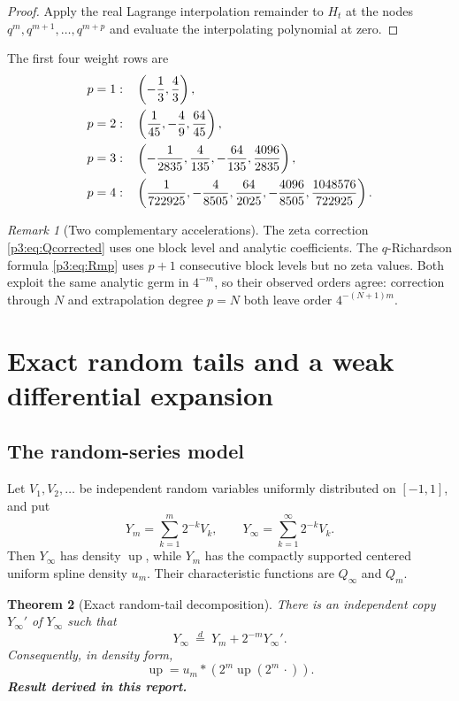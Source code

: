 \documentclass[11pt,oneside]{article}
\numberwithin{equation}{section}
\newtheorem{theorem}{Theorem}[section]
\theoremstyle{definition}
\theoremstyle{remark}
\newtheorem{remark}[theorem]{Remark}
\newcommand{\Up}{\operatorname{up}}
\newcommand{\newresult}{\textbf{Result derived in this report.}}
\begin{document}
\begin{proof}
Apply the real Lagrange interpolation remainder to $H_t$ at the nodes
$q^m,q^{m+1},\ldots,q^{m+p}$ and evaluate the interpolating polynomial at zero.
\end{proof}

The first four weight rows are
\begin{align}
 p=1:&\quad \left(-\frac13,\frac43\right),\notag\\
 p=2:&\quad \left(\frac1{45},-\frac49,\frac{64}{45}\right),\notag\\
 p=3:&\quad \left(-\frac1{2835},\frac4{135},-\frac{64}{135},\frac{4096}{2835}\right),
 \label{p3:eq:weights-first}\\
 p=4:&\quad \left(\frac1{722925},-\frac4{8505},\frac{64}{2025},
 -\frac{4096}{8505},\frac{1048576}{722925}\right).\notag
\end{align}

\begin{remark}[Two complementary accelerations]
The zeta correction \eqref{p3:eq:Qcorrected} uses one block level and analytic coefficients.
The $q$-Richardson formula \eqref{p3:eq:Rmp} uses $p+1$ consecutive block levels but no zeta
values.  Both exploit the same analytic germ in $4^{-m}$, so their observed orders agree:
correction through $N$ and extrapolation degree $p=N$ both leave order $4^{-(N+1)m}$.
\end{remark}

\section{Exact random tails and a weak differential expansion}
\label{p3:sec:probability}

\subsection{The random-series model}

Let $V_1,V_2,\ldots$ be independent random variables uniformly distributed on $[-1,1]$, and
put
\begin{equation}
 Y_m=\sum_{k=1}^{m}2^{-k}V_k,
 \qquad
 Y_\infty=\sum_{k=1}^{\infty}2^{-k}V_k.
 \label{p3:eq:Ydef}
\end{equation}
Then $Y_\infty$ has density $\Up$, while $Y_m$ has the compactly supported centered uniform
spline density $u_m$.  Their characteristic functions are $Q_\infty$ and $Q_m$.

\begin{theorem}[Exact random-tail decomposition]
\label{p3:thm:random-tail}
There is an independent copy $Y_\infty'$ of $Y_\infty$ such that
\begin{equation}
 \boxed{Y_\infty\ \stackrel{d}{=}\ Y_m+2^{-m}Y_\infty'.}
 \label{p3:eq:random-tail}
\end{equation}
Consequently, in density form,
\begin{equation}
 \boxed{
 \Up=u_m*\left(2^m\Up(2^m\,\cdot)\right).}
 \label{p3:eq:density-deconv}
\end{equation}
\newresult
\end{theorem}
\end{document}
